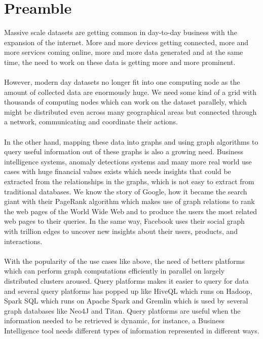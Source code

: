 \documentclass[12pt]{report}
\numberwithin{figure}{section}
\numberwithin{table}{section}
\begin{document}
\section{Preamble}

Massive scale datasets are getting common in day-to-day business with the expansion of the internet. More and more devices getting connected, more and more services coming online, more and more data generated and at the same time, the need to work on these data is getting more and more prominent.

\paragraph{}

However, modern day datasets no longer fit into one computing node as the amount of collected data are enormously huge.  We need some kind of a grid with thousands of computing nodes which can work on the dataset parallely, which might be distributed even across many geographical areas but connected through a network, communicating and coordinate their actions.

\paragraph{}

In the other hand, mapping these data into graphs and using graph algorithms to query useful information out of these graphs is also a growing need. Business intelligence systems, anomaly detections systems and many more real world use cases with huge financial values exists which needs insights that could be extracted from the relationships in the graphs, which is not easy to extract from traditional databases. We know the story of Google, how it became the search giant with their PageRank\cite{PageRank} algorithm which makes use of graph relations to rank the web pages of the World Wide Web and to produce the users the most related web pages to their queries. In the same way, Facebook uses their social graph with trillion edges\cite{Facebook} to uncover new insights about their users, products, and interactions.

\paragraph{}

With the popularity of the use cases like above, the need of betters platforms which can perform graph computations efficiently in parallel on largely distributed clusters aroused. Query platforms makes it easier to query for data and several query platforms has popped up like HiveQL which runs on Hadoop, Spark SQL which runs on Apache Spark and Gremlin which is used by several graph databases like Neo4J and Titan. Query platforms are useful when the information needed to be retrieved is dynamic, for instance, a Business Intelligence tool needs different types of information represented in different ways.
\end{document}
